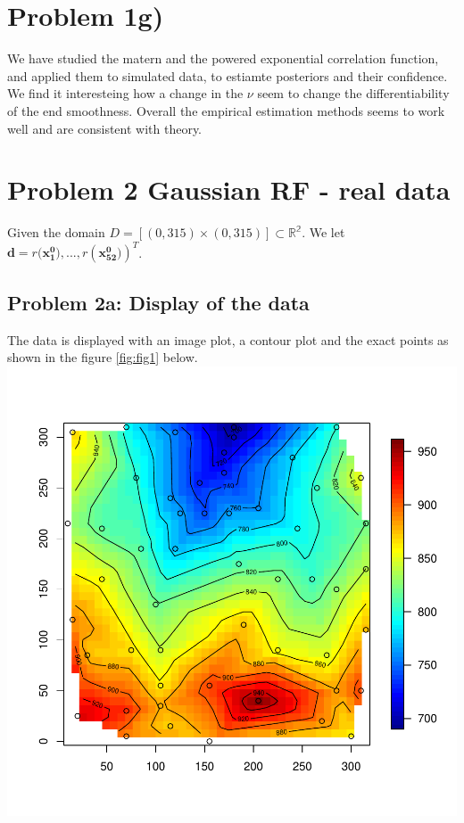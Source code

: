 \documentclass[]{article}
\newcommand{\vect}[1]{\ensuremath{\boldsymbol{\mathbf{#1}}}}
\begin{document}
\section{Problem 1g)}\label{problem-1g}

We have studied the matern and the powered exponential correlation
function, and applied them to simulated data, to estiamte posteriors and
their confidence. We find it interesteing how a change in the \(\nu\)
seem to change the differentiability of the end smoothness. Overall the
empirical estimation methods seems to work well and are consistent with
theory.

\newpage

\section{Problem 2 Gaussian RF - real
data}\label{problem-2-gaussian-rf---real-data}

Given the domain \(D = [(0,315) \times (0,315)] \subset \mathbb{R^2}\).
We let \(\vect{d}= r(\vect{x_1^0)}, ..., r(\vect{x_{52}^0)})^T\).

\subsection{Problem 2a: Display of the
data}\label{problem-2a-display-of-the-data}

The data is displayed with an image plot, a contour plot and the exact
points as shown in the figure \ref{fig:fig1} below.
\includegraphics{Exercise_1_files/figure-latex/fig1-1.pdf}
\end{document}
